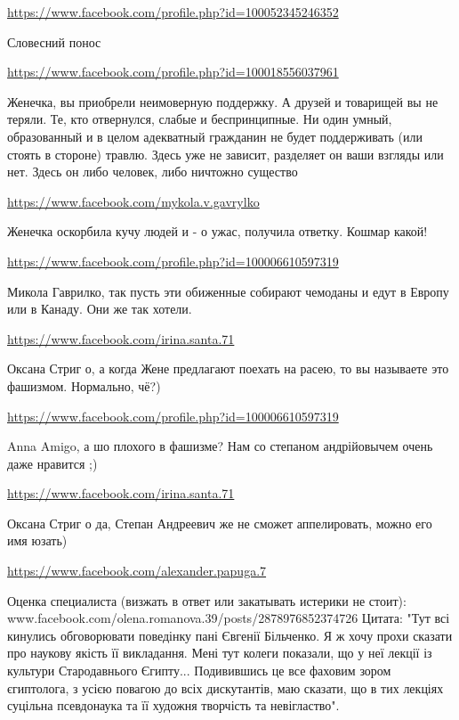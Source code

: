 \documentclass[a4paper,11pt]{extreport}
\begin{document}
\begin{itemize}
\begin{itemize}
\url{https://www.facebook.com/profile.php?id=100052345246352}

Словесний понос

\end{itemize}
\url{https://www.facebook.com/profile.php?id=100018556037961}

Женечка, вы приобрели неимоверную поддержку. А друзей и товарищей вы не теряли. Те, кто отвернулся, слабые и беспринципные. Ни один умный, образованный и в целом адекватный гражданин не будет поддерживать (или стоять в стороне) травлю. Здесь уже не зависит, разделяет он ваши взгляды или нет. Здесь он либо человек, либо ничтожно существо

\begin{itemize}
\url{https://www.facebook.com/mykola.v.gavrylko}

Женечка оскорбила кучу людей и - о ужас, получила ответку. Кошмар какой!

\url{https://www.facebook.com/profile.php?id=100006610597319}

Микола Гаврилко, так пусть эти обиженные собирают чемоданы и едут в Европу или в Канаду. Они же так хотели.

\url{https://www.facebook.com/irina.santa.71}

Оксана Стриг о, а когда Жене предлагают поехать на расею, то вы называете это фашизмом. Нормально, чё?)

\url{https://www.facebook.com/profile.php?id=100006610597319}

Anna Amigo, а шо плохого в фашизме? Нам со степаном андрійовычем очень даже нравится ;)

\url{https://www.facebook.com/irina.santa.71}

Оксана Стриг о да, Степан Андреевич же не сможет аппелировать, можно его имя юзать)

\end{itemize}
\url{https://www.facebook.com/alexander.papuga.7}

Оценка специалиста (визжать в ответ или закатывать истерики не стоит):
www.facebook.com/olena.romanova.39/posts/2878976852374726
Цитата: "Тут всі кинулись обговорювати поведінку пані Євгенії Більченко. Я ж хочу прохи сказати про наукову якість її викладання. Мені тут колеги показали, що у неї лекції із культури Стародавнього Єгипту... Подивившись це все фаховим зором єгиптолога, з усією повагою до всіх дискутантів, маю сказати, що в тих лекціях суцільна псевдонаука та її художня творчість та невігластво".


\end{itemize}
\end{document}
